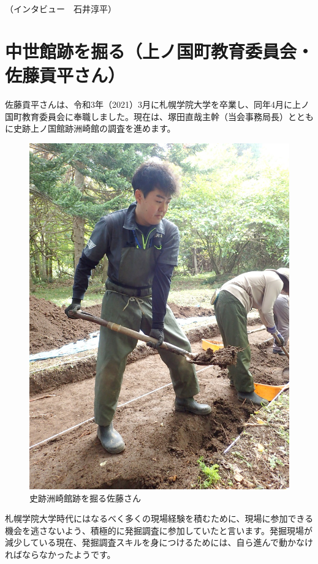 \documentclass[a4j,11pt,twocolumn,openany]{jsbook}
\begin{document}
\hspace{8zw}（インタビュー　石井淳平）


\section{中世館跡を掘る（上ノ国町教育委員会・佐藤貢平さん）}

佐藤貢平さんは、令和3年（2021）3月に札幌学院大学を卒業し、同年4月に上ノ国町教育委員会に奉職しました。現在は、塚田直哉主幹（当会事務局長）とともに史跡上ノ国館跡洲崎館の調査を進めます。

\begin{figure}[ht]
	\centering
	\includegraphics[width=0.9\linewidth]{fig/06_satou/s_satou.JPG}
	\caption{史跡洲崎館跡を掘る佐藤さん}
	\label{}
	\vspace{-1\baselineskip}
\end{figure}

札幌学院大学時代にはなるべく多くの現場経験を積むために、現場に参加できる機会を逃さないよう、積極的に発掘調査に参加していたと言います。発掘現場が減少している現在、発掘調査スキルを身につけるためには、自ら進んで動かなければならなかったようです。
\end{document}
